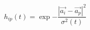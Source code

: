 \begin{equation}
  \label{eq:gaussian}
  h_{ip}(t)=\exp{-\frac{|\overrightarrow{a_i}-\overrightarrow{a_p}|^2}{\sigma^2(t)}}
\end{equation} 
